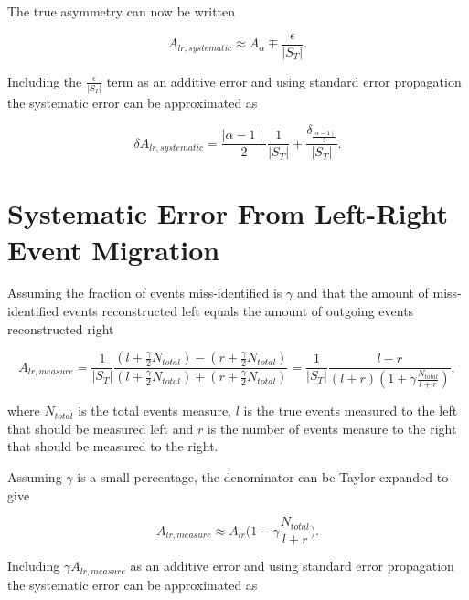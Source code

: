 \noindent
The true asymmetry can now be written

\begin{equation}
  A_{lr,systematic} \approx
  A_{\alpha} \mp \frac{\epsilon}{|S_T|}.
\end{equation}

\noindent
Including the $\frac{\epsilon}{|S_T|}$ term as an additive error and using
standard error propagation the systematic error can be approximated as

\begin{equation}
  \delta A_{lr,systematic} = \frac{ \mid\alpha - 1
    \mid}{2}\frac{1}{|S_T|} + \frac{\delta_{\frac{\mid \alpha -1
        \mid}{2}}}{|S_T|}.
\end{equation}


\section{Systematic Error From Left-Right Event Migration}
\label{app::sysLRmiss}

Assuming the fraction of events miss-identified is $\gamma$ and that the amount
of miss-identified events reconstructed left equals the amount of outgoing
events reconstructed right

\begin{equation}
  A_{lr,measure} =
  \frac{1}{|S_T|} \frac{(l+ \frac{\gamma}{2}
    N_{total}) - (r + \frac{\gamma}{2}
    N_{total})} {(l+ \frac{\gamma}{2}
    N_{total})+(r+ \frac{\gamma}{2}
    N_{total})}
  = \frac{1}{|S_T|} \frac{l - r}
         {(l+r)(1+ \gamma
           \frac{N_{total}}{l+r})},
\end{equation}

\noindent
where $N_{total}$ is the total events measure, $l$ is the true events
measured to the left that should be measured left and $r$ is the number of
events measure to the right that should be measured to the right.\par

Assuming $\gamma$ is a small percentage, the denominator can be Taylor expanded
to give

\begin{equation}
  A_{lr,measure} \approx
  A_{lr}
  \Big (1-\gamma\frac{N_{total}}{l+r}\Big).
\end{equation}

\noindent
Including $\gamma A_{lr,measure}$ as an additive error and using
standard error propagation the systematic error can be approximated as

